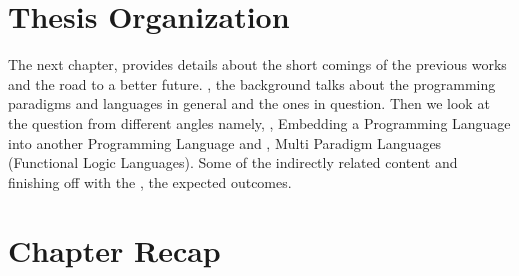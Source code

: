 \documentclass[thesis-solanki.tex]{subfiles}
\begin{document}



\section{Thesis Organization}

The next chapter,  provides details about the short comings of the
previous works and the road to a better future.
, the background talks about the programming paradigms and languages
in general and the ones in question.
Then we look at the question from different angles namely, ,  Embedding
a Programming Language into another Programming Language and  , Multi
Paradigm Languages (Functional Logic Languages).
Some of the indirectly related content  and finishing off with the
, the expected outcomes.


\section{Chapter Recap\protect{}}
\end{document}
